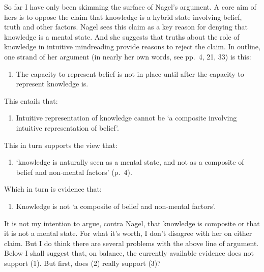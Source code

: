 \documentclass[11pt,a4paper]{extarticle}
\begin{document}
So far I have only been skimming the surface of Nagel's argument.
A core aim of hers is to oppose the claim that knowledge is a hybrid state involving belief, truth and other factors.
Nagel sees this claim as a key reason for denying that knowledge is a mental state.
And she suggests that truths about the role of knowledge in intuitive mindreading provide reasons to reject the claim.
In outline, one strand of her argument (in nearly her own words, see pp.\ 4, 21, 33) is this:
%
\begin{enumerate}
\item The capacity to represent belief is not in place until after the capacity to represent knowledge is.
\end{enumerate}
This entails that:
\begin{enumerate}[resume]
\item Intuitive representation of knowledge cannot be `a composite involving intuitive representation of belief'.
\end{enumerate}
This in turn supports the view  that:
\begin{enumerate}[resume]
\item `knowledge is naturally seen as a mental state, and not as a composite of belief and non-mental factors' (p.\ 4).
\end{enumerate}
Which in turn is evidence that:
\begin{enumerate}[resume]
\item Knowledge is not `a composite of belief and non-mental factors'.
\end{enumerate}
%
It is not my intention to argue, contra Nagel, that knowledge is composite or that it is not a mental state.
For what it's worth,
I don't disagree with her on either claim.
But I do think there are several problems with the above line of argument.
Below I shall suggest that, on balance, the currently available evidence does not support (1).  
But first, does (2) really support (3)?
\end{document}
